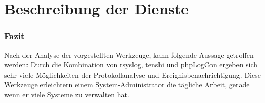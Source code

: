 \part{Beschreibung der Dienste}


\newpage

\newpage

\newpage


\section{Fazit}
Nach der Analyse der vorgestellten Werkzeuge, kann folgende Aussage getroffen werden: Durch die Kombination von rsyslog, tenshi und phpLogCon ergeben sich sehr viele Möglichkeiten der Protokollanalyse und Ereignisbenachrichtigung.
Diese Werkzeuge erleichtern einem System-Administrator die tägliche Arbeit, gerade wenn er viele Systeme zu verwalten hat.